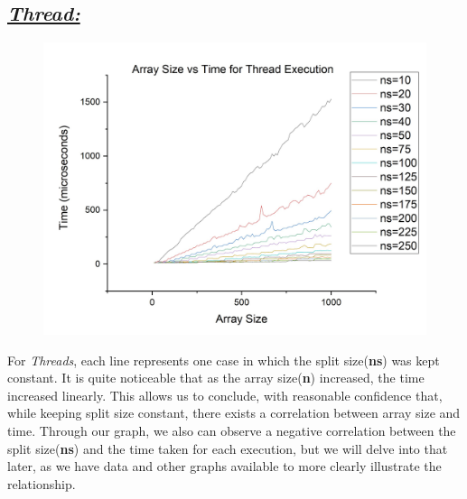\documentclass{article}
\begin{document}
            \subsection*{\color{red}\textit{\underline{Thread:}}\color{black}}
                \begin{figure}[H]
                    \centering
                    \includegraphics[width=19cm]{svt-Threads}
                \end{figure}
                For \color{red}\textit{Threads}\color{black}, each line represents one case in which the split size(\textbf{ns}) was kept constant.
                It is quite noticeable that as the array size(\textbf{n}) increased, the time increased linearly. 
                This allows us to conclude, with reasonable confidence that, while keeping split size constant, there exists a correlation between array size and time. Through our graph, we also can observe a negative correlation between the split size(\textbf{ns}) and the time taken for each execution, but we will delve into that later, as we have data and other graphs available to more clearly illustrate the relationship.
\end{document}
